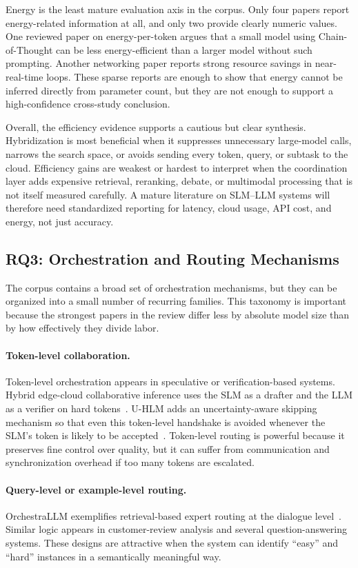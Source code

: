 Energy is the least mature evaluation axis in the corpus. Only four papers report energy-related information at all, and only two provide clearly numeric values. One reviewed paper on energy-per-token argues that a small model using Chain-of-Thought can be less energy-efficient than a larger model without such prompting. Another networking paper reports strong resource savings in near-real-time loops. These sparse reports are enough to show that energy cannot be inferred directly from parameter count, but they are not enough to support a high-confidence cross-study conclusion.

Overall, the efficiency evidence supports a cautious but clear synthesis. Hybridization is most beneficial when it suppresses unnecessary large-model calls, narrows the search space, or avoids sending every token, query, or subtask to the cloud. Efficiency gains are weakest or hardest to interpret when the coordination layer adds expensive retrieval, reranking, debate, or multimodal processing that is not itself measured carefully. A mature literature on SLM--LLM systems will therefore need standardized reporting for latency, cloud usage, API cost, and energy, not just accuracy.

\subsection{RQ3: Orchestration and Routing Mechanisms}
The corpus contains a broad set of orchestration mechanisms, but they can be organized into a small number of recurring families. This taxonomy is important because the strongest papers in the review differ less by absolute model size than by how effectively they divide labor.

\paragraph{Token-level collaboration.}
Token-level orchestration appears in speculative or verification-based systems. Hybrid edge-cloud collaborative inference uses the SLM as a drafter and the LLM as a verifier on hard tokens~\cite{hao2024hybrid}. U-HLM adds an uncertainty-aware skipping mechanism so that even this token-level handshake is avoided whenever the SLM's token is likely to be accepted~\cite{oh2025uncertainty}. Token-level routing is powerful because it preserves fine control over quality, but it can suffer from communication and synchronization overhead if too many tokens are escalated.

\paragraph{Query-level or example-level routing.}
OrchestraLLM exemplifies retrieval-based expert routing at the dialogue level~\cite{lee2024orchestrallm}. Similar logic appears in customer-review analysis and several question-answering systems. These designs are attractive when the system can identify ``easy'' and ``hard'' instances in a semantically meaningful way.

